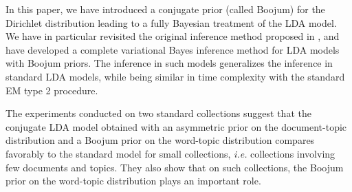 In this paper, we have introduced a conjugate prior (called Boojum) for the Dirichlet distribution leading to a fully Bayesian treatment of the LDA model. We have in particular revisited the original inference method proposed in \cite{blei_latent_2003}, and have developed a complete variational Bayes inference method for LDA models with Boojum priors. The inference in such models generalizes the inference in standard LDA models, while being similar in time complexity with the standard EM type 2 procedure.

The experiments conducted on two standard collections suggest that the conjugate LDA model obtained with an asymmetric prior on the document-topic distribution and a Boojum prior on the word-topic distribution compares favorably to the standard model for small collections, {\it i.e.} collections involving few documents and topics. They also show that on such collections, the Boojum prior on the word-topic distribution plays an important role.
 